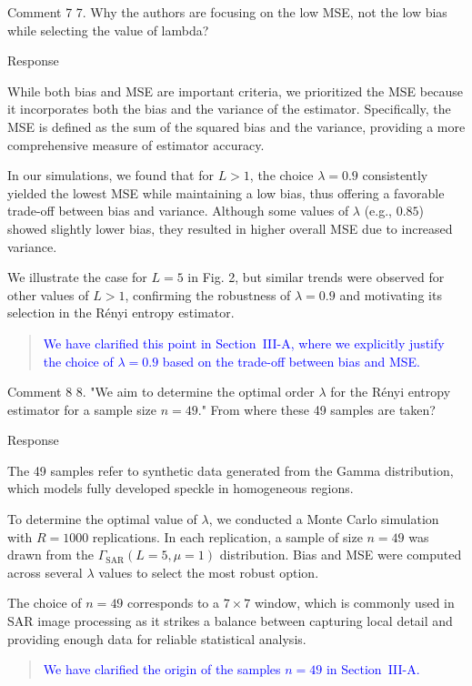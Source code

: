 \documentclass[11pt]{report}
\begin{document}
\vspace{0.5em} 
\begin{reviewbox}{Comment 7}
7. Why the authors are focusing on the low MSE, not the low bias while selecting the value of lambda?
\end{reviewbox}

\begin{responsebox}{Response}

While both bias and MSE are important criteria, we prioritized the MSE because it incorporates both the bias and the variance of the estimator. 
Specifically, the MSE is defined as the sum of the squared bias and the variance, providing a more comprehensive measure of estimator accuracy.

In our simulations, we found that for $L > 1$, the choice $\lambda = 0.9$ consistently yielded the lowest MSE while maintaining a low bias, thus offering a favorable trade-off between bias and variance. Although some values of $\lambda$ (e.g., $0.85$) showed slightly lower bias, they resulted in higher overall MSE due to increased variance.

We illustrate the case for $L = 5$ in Fig. 2, but similar trends were observed for other values of $L > 1$, confirming the robustness of $\lambda = 0.9$ and motivating its selection in the Rényi entropy estimator.
\begin{quote}
\textcolor{blue}{We have clarified this point in Section~III-A, where we explicitly justify the choice of $\lambda = 0.9$ based on the trade-off between bias and MSE.}
\end{quote}
\end{responsebox}

\vspace{0.5em}

\begin{reviewbox}{Comment 8}
8. "We aim to determine the optimal order $\lambda$ for the Rényi entropy estimator for a sample size $n=49$." From where these 49 samples are taken?
\end{reviewbox}

\begin{responsebox}{Response}


The 49 samples refer to synthetic data generated from the Gamma distribution, which models fully developed speckle in homogeneous regions.

To determine the optimal value of $\lambda$, we conducted a Monte Carlo simulation with $R = 1000$ replications.
 In each replication, a sample of size $n = 49$ was drawn from the $\Gamma_{\text{SAR}}(L = 5, \mu = 1)$ distribution. Bias and MSE were computed across several $\lambda$ values to select the most robust option.

The choice of $n = 49$ corresponds to a $7 \times 7$ window, which is commonly used in SAR image processing as it strikes a balance between capturing local detail and providing enough data for reliable statistical analysis.
\begin{quote}
\textcolor{blue}{We have clarified the origin of the samples $n = 49$ in Section~III-A.}
\end{quote}
\end{responsebox}
\end{document}
